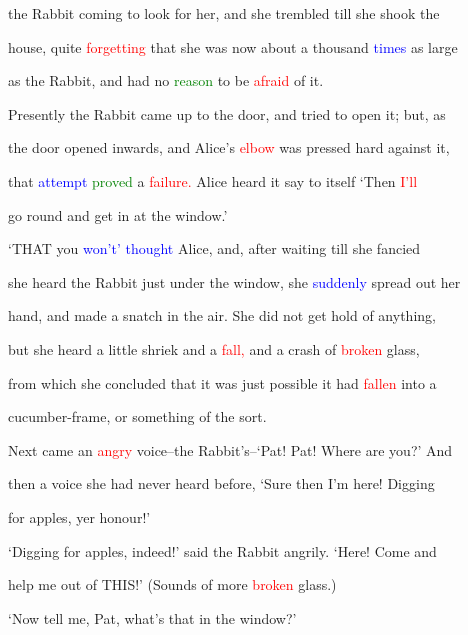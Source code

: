  the Rabbit coming to look for her, and she trembled till she shook the

 house, quite \textcolor{red}{forgetting} that she was now about a thousand \textcolor{blue}{times} as large

 as the Rabbit, and had no \textcolor{green}{reason} to be \textcolor{red}{afraid} of it.



 Presently the Rabbit came up to the door, and tried to open it; but, as

 the door opened inwards, and Alice’s \textcolor{red}{elbow} was pressed hard against it,

 that \textcolor{blue}{attempt} \textcolor{green}{proved} a \textcolor{red}{failure.} Alice heard it say to itself ‘Then \textcolor{red}{I’ll}

 go round and get in at the window.’



 ‘THAT you \textcolor{blue}{won’t’} \textcolor{blue}{thought} Alice, and, after \textcolor{BurntOrange}{waiting} till she \textcolor{BurntOrange}{fancied}

 she heard the Rabbit just under the window, she \textcolor{blue}{suddenly} spread out her

 hand, and made a snatch in the air. She did not get hold of anything,

 but she heard a little \textcolor{BurntOrange}{shriek} and a \textcolor{red}{fall,} and a \textcolor{BurntOrange}{crash} of \textcolor{red}{broken} glass,

 from which she concluded that it was just possible it had \textcolor{red}{fallen} into a

 cucumber-frame, or something of the sort.



 Next came an \textcolor{red}{angry} voice--the Rabbit’s--‘Pat! Pat! Where are you?’ And

 then a voice she had never heard before, ‘Sure then I’m here! Digging

 for apples, yer honour!’



 ‘Digging for apples, indeed!’ said the Rabbit angrily. ‘Here! Come and

 help me out of THIS!’ (Sounds of more \textcolor{red}{broken} glass.)



 ‘Now tell me, Pat, what’s that in the window?’



